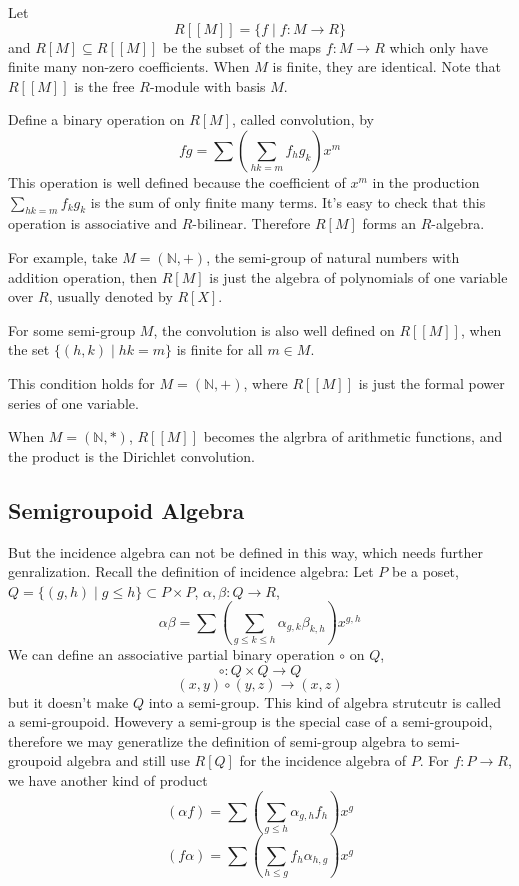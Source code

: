 \documentclass{article}
\begin{document}
Let $$R[[M]] = \{f \mid f : M \to R\}$$ and $R[M] \subseteq R[[M]]$ be the subset
of the maps $f : M \to R$ which only have finite many non-zero coefficients.
When $M$ is finite, they are identical.
Note that $R[[M]]$ is the free $R$-module with basis $M$.

Define a binary operation on $R[M]$, called convolution, by
$$fg = \sum (\sum_{hk = m} f_h g_k) x^m$$
This operation is well defined because the coefficient of $x^m$ in the production $\sum_{hk=m} f_k g_k$
is the sum of only finite many terms. It's easy to check that this operation is associative and $R$-bilinear.
Therefore $R[M]$ forms an $R$-algebra.

For example, take $M = (\mathbb N, +)$, the semi-group of natural numbers with addition operation,
then $R[M]$ is just the algebra of polynomials of one variable over $R$, usually denoted by $R[X]$.

For some semi-group $M$, the convolution is also well defined on $R[[M]]$,
when the set $\{(h, k) \mid hk = m\}$ is finite for all $m \in M$.

This condition holds for $M = (\mathbb N, +)$, where $R[[M]]$ is just the formal power series of one variable.

When $M = (\mathbb N, \ast)$, $R[[M]]$ becomes the algrbra of arithmetic functions,
and the product is the Dirichlet convolution.

\subsection{Semigroupoid Algebra}
But the incidence algebra can not be defined in this way, which needs further genralization.
Recall the definition of incidence algebra:
Let $P$ be a poset, $Q = \{(g, h) \mid g \leq h\} \subset P \times P$,
$\alpha, \beta : Q \to R$,
$$\alpha\beta = \sum (\sum_{g\leq k \leq h} \alpha_{g,k} \beta_{k,h})x^{g,h}$$
We can define an associative partial binary operation $\circ$ on $Q$,
$$\circ : Q \times Q \to Q$$
$$(x, y) \circ (y, z) \to (x, z)$$
but it doesn't make $Q$ into a semi-group.
This kind of algebra strutcutr is called a semi-groupoid.
Howevery a semi-group is the special case of a semi-groupoid,
therefore we may generatlize the definition of semi-group algebra
to semi-groupoid algebra and still use $R[Q]$ for the incidence algebra of $P$.
For $f : P \to R$, we have another kind of product
$$(\alpha f) = \sum (\sum_{g\leq h} \alpha_{g, h} f_h)x^g$$
$$(f \alpha) = \sum (\sum_{h\leq g} f_h \alpha_{h, g})x^g$$
\end{document}
